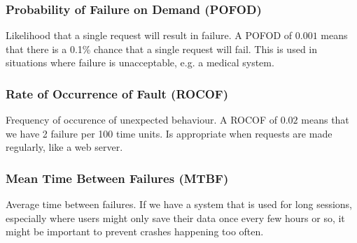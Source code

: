 \subsubsection{Probability of Failure on Demand (POFOD)}
Likelihood that a single request will result in failure. A POFOD of $0.001$ means that there is a 0.1\% chance that a single request will fail. This is used in situations where failure is unacceptable, e.g. a medical system.

\subsubsection{Rate of Occurrence of Fault (ROCOF)}
Frequency of occurence of unexpected behaviour. A ROCOF of $0.02$ means that we have 2 failure per 100 time units. Is appropriate when requests are made regularly, like a web server.

\subsubsection{Mean Time Between Failures (MTBF)}
Average time between failures. If we have a system that is used for long sessions, especially where users might only save their data once every few hours or so, it might be important to prevent crashes happening too often.